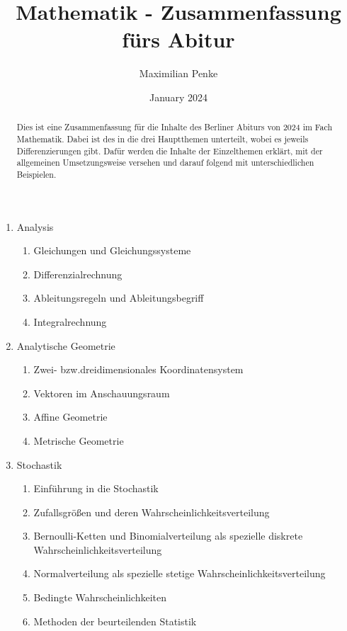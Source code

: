 \documentclass{article}
\title{Mathematik - Zusammenfassung fürs Abitur}
\author{Maximilian Penke}
\date{January 2024}
\begin{document}
    \maketitle

    \begin{abstract}
        Dies ist eine Zusammenfassung für die Inhalte des Berliner Abiturs von 2024 im Fach Mathematik. Dabei ist des in die drei Hauptthemen unterteilt, wobei es jeweils Differenzierungen gibt. Dafür werden die Inhalte der Einzelthemen erklärt, mit der allgemeinen Umsetzungsweise versehen und darauf folgend mit unterschiedlichen Beispielen.
    \end{abstract}

    \begin{enumerate}

        \item Analysis
        \begin{enumerate}
            \item Gleichungen und Gleichungssysteme
            \item Differenzialrechnung
            \item Ableitungsregeln und Ableitungsbegriff
            \item Integralrechnung
        \end{enumerate}

        \item Analytische Geometrie
        \begin{enumerate}
            \item Zwei- bzw.dreidimensionales Koordinatensystem
            \item Vektoren im Anschauungsraum
            \item Affine Geometrie
            \item Metrische Geometrie
        \end{enumerate}

        \item Stochastik
        \begin{enumerate}
            \item Einführung in die Stochastik
            \item Zufallsgrößen und deren Wahrscheinlichkeitsverteilung
            \item Bernoulli-Ketten und Binomialverteilung als spezielle diskrete Wahrscheinlichkeitsverteilung
            \item Normalverteilung als spezielle stetige Wahrscheinlichkeitsverteilung
            \item Bedingte Wahrscheinlichkeiten
            \item Methoden der beurteilenden Statistik
        \end{enumerate}
    \end{enumerate}
\end{document}
